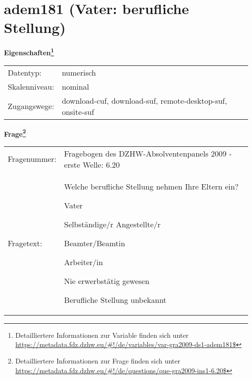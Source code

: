 
    \setcounter{footnote}{0}

    \vspace*{-1.8cm}
	\section{adem181 (Vater: berufliche Stellung)}
	\label{section:adem181}



    \vspace*{0.5cm}
    \noindent\textbf{Eigenschaften\footnote{Detailliertere Informationen zur Variable finden sich unter
		\url{https://metadata.fdz.dzhw.eu/\#!/de/variables/var-gra2009-ds1-adem181$}}}\\
	\begin{tabularx}{\hsize}{@{}lX}
	Datentyp: & numerisch \\
	Skalenniveau: & nominal \\
	Zugangswege: &
	  download-cuf, 
	  download-suf, 
	  remote-desktop-suf, 
	  onsite-suf
 \\
    \end{tabularx}



				\vspace*{0.5cm}
                \noindent\textbf{Frage\footnote{Detailliertere Informationen zur Frage finden sich unter
		              \url{https://metadata.fdz.dzhw.eu/\#!/de/questions/que-gra2009-ins1-6.20$}}}\\
				\begin{tabularx}{\hsize}{@{}lX}
					Fragenummer: &
					  Fragebogen des DZHW-Absolventenpanels 2009 - erste Welle:
					  6.20
 \\
					Fragetext: & Welche berufliche Stellung nehmen Ihre Eltern ein?\par  Vater\par  Selbständige/r Angestellte/r\par  Beamter/Beamtin\par  Arbeiter/in\par  Nie erwerbstätig gewesen\par  Berufliche Stellung unbekannt \\
				\end{tabularx}





